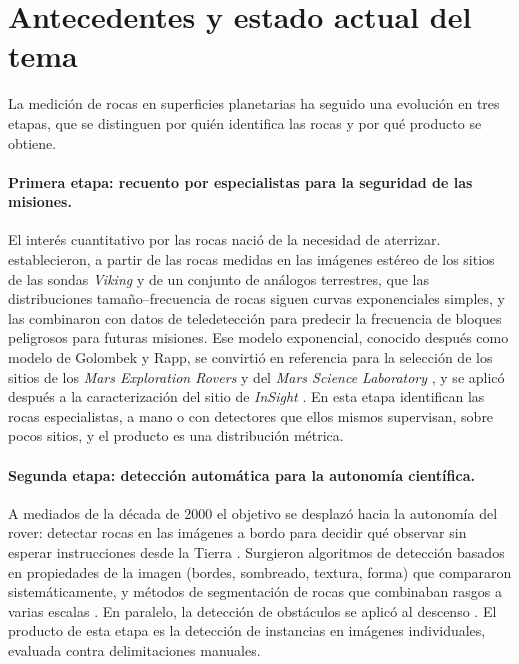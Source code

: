 \section{Antecedentes y estado actual del tema}
\label{sec:antecedentes}

La medición de rocas en superficies planetarias ha seguido una evolución en tres etapas, que
se distinguen por quién identifica las rocas y por qué producto se obtiene.

\paragraph{Primera etapa: recuento por especialistas para la seguridad de las misiones.} El
interés cuantitativo por las rocas nació de la necesidad de aterrizar. \citet{golombek1997rocks}
establecieron, a partir de las rocas medidas en las imágenes estéreo de los sitios de las
sondas \textit{Viking} y de un conjunto de análogos terrestres, que las distribuciones
tamaño--frecuencia de rocas siguen curvas exponenciales simples, y las combinaron con datos
de teledetección para predecir la frecuencia de bloques peligrosos para futuras misiones.
Ese modelo exponencial, conocido después como modelo de Golombek y Rapp, se convirtió en
referencia para la selección de los sitios de los \textit{Mars Exploration Rovers}
\citep{golombek2003mer} y del \textit{Mars Science Laboratory} \citep{golombek2012msl}, y se
aplicó después a la caracterización del sitio de \textit{InSight} \citep{golombek2021insight}.
En esta etapa identifican las rocas especialistas, a mano o con detectores que ellos mismos
supervisan, sobre pocos sitios, y el producto es una distribución métrica.

\paragraph{Segunda etapa: detección automática para la autonomía científica.} A mediados de
la década de 2000 el objetivo se desplazó hacia la autonomía del rover: detectar rocas en las
imágenes a bordo para decidir qué observar sin esperar instrucciones desde la Tierra
\citep{castano2007oasis}. Surgieron algoritmos de detección basados en propiedades de la
imagen (bordes, sombreado, textura, forma) que \citet{thompson2007rockdet} compararon
sistemáticamente, y métodos de segmentación de rocas que combinaban rasgos a varias escalas
\citep{dunlop2007multiscale}. En paralelo, la detección de obstáculos se aplicó al descenso
\citep{huertas2006hazard}. El producto de esta etapa es la detección de instancias en
imágenes individuales, evaluada contra delimitaciones manuales.

